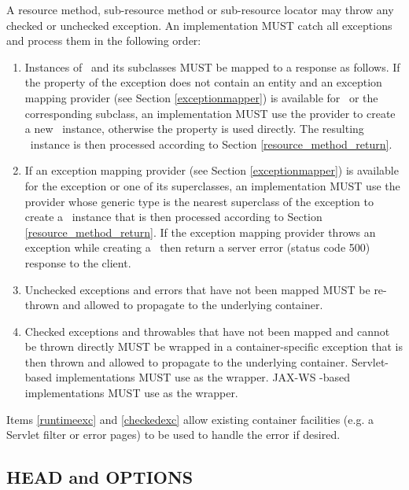 A resource method, sub-resource method or sub-resource locator may throw any checked or unchecked exception. An implementation MUST catch all exceptions and process them in the following order:

\begin{enumerate}
\item Instances of \WebAppExc\ and its subclasses MUST be mapped to a response as follows. If the  property of the exception does not contain an entity and an exception mapping provider (see Section \ref{exceptionmapper}) is available for \WebAppExc\ or the corresponding subclass, an implementation MUST use the provider to create a new \Response\ instance, otherwise the  property is used directly. The resulting \Response\ instance is then processed according to Section \ref{resource_method_return}.
\item If an exception mapping provider (see Section \ref{exceptionmapper}) is available for the exception or one of its superclasses, an implementation MUST use the provider whose generic type is the nearest superclass of the exception to create a \Response\ instance that is then processed according to Section \ref{resource_method_return}. If the exception mapping provider throws an exception while creating a \Response\ then return a server error (status code 500) response to the client.
\item\label{runtimeexc} Unchecked exceptions and errors that have not been mapped MUST be re-thrown and allowed to propagate to the underlying container.
\item\label{checkedexc} Checked exceptions and throwables that have not been mapped and cannot be thrown directly MUST be wrapped in a container-specific exception that is then thrown and allowed to propagate to the underlying container. Servlet-based implementations MUST use  as the wrapper. JAX-WS -based implementations MUST use  as the wrapper.
\end{enumerate}

\begin{nnnote}Items \ref{runtimeexc} and \ref{checkedexc} allow existing container facilities (e.g. a Servlet filter or error pages) to be used to handle the error if desired.\end{nnnote}

\subsection{HEAD and OPTIONS}
\label{head_and_options}

